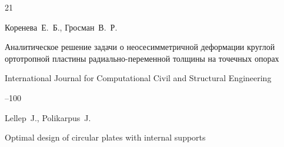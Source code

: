 \begin{thebibliography}{21}







\by Коренева~Е.~Б., Гросман~В.~Р.

\paper Аналитическое решение задачи о неосесимметричной деформации круглой ортотропной пластины радиально-переменной толщины на точечных опорах

\jour International Journal for Computational Civil and Structural Engineering



--100






















\by Lellep~J., Polikarpus~J.

\paper Optimal design of circular plates with internal supports


\end{thebibliography}
